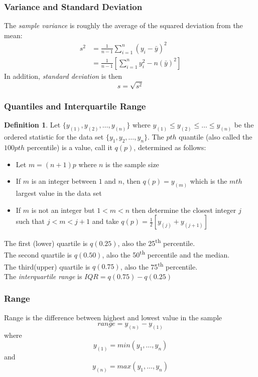 \documentclass[12pt, leqno]{article}
\theoremstyle{definition}
\newtheorem*{defn}{Definition}
\begin{document}
  \subsubsection{Variance and Standard Deviation}
  The \emph{sample variance} is roughly the average of the squared deviation from the mean:
  \begin{align*}
  s^{2} &= \frac{1}{n-1}\sum_{i=1}^{n}(y_{i} - \bar{y})^{2} \\
  &= \frac{1}{n-1}
  \left[
  \sum_{i=1}^{n}y_{i}^{2} - n(\bar{y})^{2}
  \right]
  \end{align*}
  In addition, \emph{standard deviation} is then
  $$s = \sqrt{s^{2}}$$

  \subsubsection{Quantiles and Interquartile Range} \label{iqr}
  \begin{defn}
    Let $\{y_{(1)}, y_{(2)}, \dots, y_{(n)}\}$ where $y_{(1)} \leq y_{(2)} \leq \dots \leq y_{(n)}$ be the ordered statistic for the data set $\{y_1, y_2, \dots, y_n\}$.
    The $pth$ quantile (also called the $100pth$ percentile) is a value, call it $q(p)$, determined as follows:
    \begin{itemize}
    \item Let $m = (n+1)p$ where $n$ is the sample size
    \item If $m$ is an integer between $1$ and $n$, then $q(p) = y_{(m)}$ which is the $mth$ largest value in the data set
    \item If $m$ is not an integer but $1 < m < n$ then determine the closest integer $j$ such that $j < m < j+1$ and take $q(p) = \frac{1}{2}[y_{(j)} + y_{(j+1)}]$
    \end{itemize}
  \end{defn}
  The first (lower) quartile is $q(0.25)$, also the 25\textsuperscript{th} percentile. \\
  The second quartile is $q(0.50)$, also the 50\textsuperscript{th} percentile and the median. \\
  The third(upper) quartile is $q(0.75)$, also the 75\textsuperscript{th} percentile. \\

  The \emph{interquartile range} is $IQR = q(0.75) - q(0.25)$

  \subsubsection{Range}
  Range is the difference between highest and lowest value in the sample
  $$range = y_{(n)} - y_{(1)}$$
  where
  $$y_{(1)} = min(y_{1}, \dots, y_{n})$$
  and
  $$y_{(n)} = max(y_{1}, \dots, y_{n})$$
\end{document}
